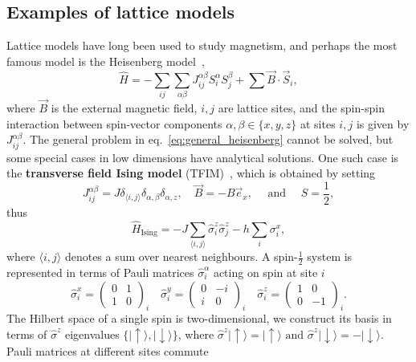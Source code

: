 \subsection{Examples of lattice models}
\label{subsec:latt-examples}
Lattice models have long been used to study magnetism, and perhaps the most famous model is the Heisenberg model~\cite{heisenberg1985theorie},
\begin{equation}
\label{eq:general_heisenberg}
\hat H = -\sum_{ij} \sum_{\alpha\beta} J^{\alpha \beta}_{ij} S^{\alpha}_{i} S^{\beta}_{j} + \sum \vec{B}\cdot \vec{S}_i,
\end{equation}
where $\vec{B}$ is the external magnetic field, $i, j$ are lattice sites, and the spin-spin interaction between spin-vector components $\alpha, \beta \in \{x, y, z\}$ at sites $i, j$ is given by $J^{\alpha \beta}_{ij}$. The general problem in eq.~\eqref{eq:general_heisenberg} cannot be solved, but some special cases in low dimensions have analytical solutions. One such case is the \textbf{transverse field Ising model} (TFIM)~\cite{de1963collective}, which is obtained by setting
\begin{equation}
	J^{\alpha \beta}_{ij} = J \delta_{\langle i, j \rangle} \delta_{\alpha, \beta} \delta_{\alpha, z}, \quad \vec{B} = -B \vec{e}_x, \quad \text{ and } \quad S = \frac{1}{2},
\end{equation}
thus
\begin{equation}
	\label{eq:h-ising}
	\hat H_{\mathrm{Ising}}=-J \sum_{\langle i, j\rangle} \hat{\sigma}^z_{i} \hat{\sigma}^z_{j}-h \sum_{i} \sigma^x_{i},
\end{equation}
where $\langle i, j\rangle$ denotes a sum over nearest neighbours. A spin-$\frac{1}{2}$ system is represented in terms of Pauli matrices $\hat \sigma_i^{\alpha}$ acting on spin at site $i$
\begin{equation}
\hat{\sigma}^x_{i}=\left(\begin{array}{cc}0 & 1 \\ 1 & 0\end{array}\right)_{i} \quad \hat{\sigma}^y_{i}=\left(\begin{array}{cc}0 & -i \\ i & 0\end{array}\right)_{i} \quad \hat{\sigma}^z_{i}=\left(\begin{array}{cc}1 & 0 \\ 0 & -1\end{array}\right)_{i}.
\end{equation}
The Hilbert space of a single spin is two-dimensional, we construct its basis in terms of $\hat \sigma^z$ eigenvalues $\{|\uparrow\rangle,|\downarrow\rangle\}$, where $\hat{\sigma}^{z}|\uparrow\rangle=|\uparrow\rangle \text { and } \hat{\sigma}^{z}|\downarrow\rangle=-|\downarrow\rangle$. Pauli matrices at different sites commute
